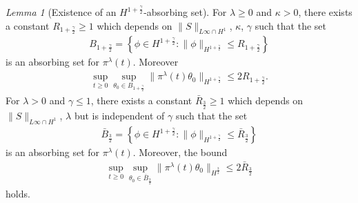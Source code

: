 \documentclass[reqno]{amsart}%
\theoremstyle{definition}
\theoremstyle{remark}
\numberwithin{equation}{section}
\newtheorem{lemma}[theorem]{Lemma}
\newcommand{\1}{\mathbf{1}}
\newcommand{\pin}{\pi^{\lambda}}
\numberwithin{equation}{section}
\numberwithin{theorem}{section}
\numberwithin{figure}{section}
\begin{document}
\begin{lemma}[Existence of an $H^{1+\frac{\gamma}{2}}$-absorbing set]\label{Existence of an H 1+gamma/2 absorbing set lemma}
For $\lambda\ge0$ and $\kappa>0$, there exists a constant $R_{1+\frac{\gamma}{2}}\ge1$ which depends on $\|S\|_{L\infty\cap H^1}$, $\kappa$, $\gamma$ such that the set
\begin{align*}
B_{1+\frac{\gamma}{2}}=\left\{\phi\in H^{1+\frac{\gamma}{2}}:\|\phi\|_{H^{1+\frac{\gamma}{2}}}\le R_{1+\frac{\gamma}{2}}\right\}
\end{align*}
is an absorbing set for $\pin(t)$. Moreover
\begin{align}\label{bound on theta in H 1+gamma/2}
\sup_{t\ge0}\sup_{\theta_0\in B_{1+\frac{\gamma}{2}}}\|\pin(t)\theta_0\|_{H^{1+\frac{\gamma}{2}}}\le 2R_{1+\frac{\gamma}{2}}.
\end{align}
For $\lambda>0$ and $\gamma\le1$, there exists a constant $\bar{R}_{\frac{3}{2}}\ge1$ which depends on $\|S\|_{L\infty\cap H^1}$, $\lambda$ but is independent of $\gamma$ such that the set
\begin{align*}
\bar{B}_{\frac{3}{2}}=\left\{\phi\in H^{1+\frac{\gamma}{2}}:\|\phi\|_{H^{1+\frac{\gamma}{2}}}\le \bar{R}_{\frac{3}{2}}\right\}
\end{align*}
is an absorbing set for $\pin(t)$. Moreover, the bound 
\begin{align}\label{bound on theta in H 1+gamma/2 gamma=1}
\sup_{t\ge0}\sup_{\theta_0\in \bar{B}_{\frac{3}{2}}}\|\pin(t)\theta_0\|_{H^{\frac{3}{2}}}\le 2\bar{R}_{\frac{3}{2}}
\end{align}
holds.
\end{lemma}
\end{document}
